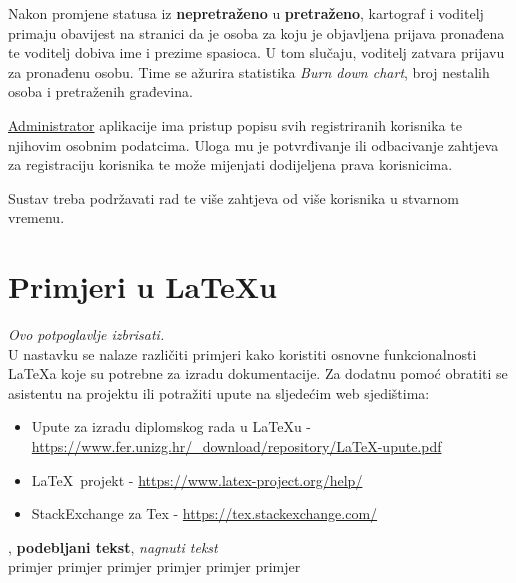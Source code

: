 			Nakon promjene statusa iz \textbf{nepretraženo} u \textbf{pretraženo}, kartograf i voditelj primaju obavijest na stranici da je osoba za koju je objavljena prijava pronađena te voditelj dobiva ime i prezime spasioca. U tom slučaju, voditelj zatvara prijavu za pronađenu osobu. Time se ažurira statistika \textit{Burn down chart}, broj nestalih osoba i pretraženih građevina. 
			
			\underline{Administrator} aplikacije ima pristup popisu svih registriranih korisnika te njihovim osobnim podatcima. Uloga mu je potvrđivanje ili odbacivanje zahtjeva za registraciju korisnika te može mijenjati dodijeljena prava korisnicima.
			
			Sustav treba podržavati rad te više zahtjeva od više korisnika u stvarnom vremenu. 
		
		\eject
		
		\section{Primjeri u \LaTeX u}
		
		\textit{Ovo potpoglavlje izbrisati.}\\

		U nastavku se nalaze različiti primjeri kako koristiti osnovne funkcionalnosti \LaTeX a koje su potrebne za izradu dokumentacije. Za dodatnu pomoć obratiti se asistentu na projektu ili potražiti upute na sljedećim web sjedištima:
		\begin{itemize}
			\item Upute za izradu diplomskog rada u \LaTeX u - \url{https://www.fer.unizg.hr/_download/repository/LaTeX-upute.pdf}
			\item \LaTeX\ projekt - \url{https://www.latex-project.org/help/}
			\item StackExchange za Tex - \url{https://tex.stackexchange.com/}\\
		
		\end{itemize} 	


		
		\noindent {}, \textbf{podebljani tekst}, 	\textit{nagnuti tekst}\\
		\noindent \normalsize primjer \large primjer \Large primjer \LARGE {primjer} \huge {primjer} \Huge primjer \normalsize
				
